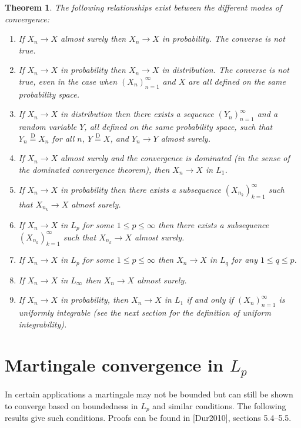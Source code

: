 \documentclass[11pt]{report}
\theoremstyle{plain}
\newtheorem{thm}{Theorem}[chapter]
\theoremstyle{definition}
\begin{document}
\begin{thm}
The following relationships exist between the different modes of convergence:

\begin{enumerate}[label=\arabic*.]
\item If $X_n\to X$ almost surely then $X_n\to X$ in probability. The converse is not true.
\item If $X_n\to X$ in probability then $X_n \to X$ in distribution. The converse is not true, even in the case when $(X_n)_{n=1}^\infty$ and $X$ are all defined on the same probability space.
\item If $X_n\to X$ in distribution then there exists a sequence $(Y_n)_{n=1}^\infty$ and a random variable $Y$, all defined on the same probability space, such that $Y_n \stackrel{\textrm{D}}{=} X_n$ for all $n$, $Y\stackrel{\textrm{D}}{=} X$, and $Y_n\to Y$ almost surely.
\item If $X_n\to X$ almost surely and the convergence is dominated (in the sense of the dominated convergence theorem), then $X_n\to X$ in $L_1$.
\item If $X_n\to X$ in probability then there exists a subsequence $(X_{n_k})_{k=1}^\infty$ such that $X_{n_k}\to X$ almost surely.
\item If $X_n\to X$ in $L_p$ for some $1\le p \le\infty$ then there exists a subsequence $(X_{n_k})_{k=1}^\infty$ such that $X_{n_k}\to X$ almost surely.
\item If $X_n\to X$ in $L_p$ for some $1\le p\le\infty$ then $X_n\to X$ in $L_q$ for any $1\le q\le p$.
\item If $X_n \to X$ in $L_\infty$ then $X_n\to X$ almost surely.
\item If $X_n\to X$ in probability, then $X_n\to X$ in $L_1$ if and only if $(X_n)_{n=1}^\infty$ is uniformly integrable (see the next section for the definition of uniform integrability).
\end{enumerate}

\end{thm}

\section{Martingale convergence in $L_p$}
In certain applications a martingale may not be bounded but can still be shown to converge based on boundedness in $L_p$ and similar conditions. The following results give such conditions. Proofs can be found in [Dur2010], sections 5.4--5.5.
\end{document}

